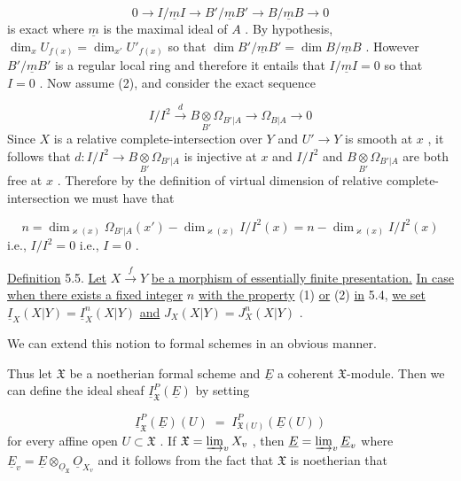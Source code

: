 \begin{equation*}
0 \to I/\underline{m}I \to B'/\underline{m}B' \to B/\underline{m}B \to 0
\end{equation*}
is exact where $\underline{m}$ is the maximal ideal of $A$ . By hypothesis, $\dim_{x}U_{f(x)} = \dim_{x'}U'_{f(x)}$ so that $\dim B'/\underline{m}B' = \dim B/\underline{m}B$ . However $B'/\underline{m}B'$ is a regular local ring and therefore it entails that $I/\underline{m}I = 0$ so that $I = 0$ . Now assume (2), and consider the exact sequence

\begin{equation*}
I/I^{2} \overset{d}{\to} B \underset{B'}{\otimes} \Omega_{B'|A} \to \Omega_{B|A} \to 0
\end{equation*}
Since $X$ is a relative complete-intersection over $Y$ and $U' \to Y$ is smooth at $x$ , it follows that $d : I/I^{2} \to B \underset{B'}{\otimes} \Omega_{B'|A}$ is injective at $x$ and $I/I^{2}$ and $B \underset{B'}{\otimes} \Omega_{B'|A}$ are both free at $x$ . Therefore by the definition of virtual dimension of relative complete-intersection we must have that

\begin{equation*}
n = \dim_{\varkappa(x)}\Omega_{B'|A}(x') - \dim_{\varkappa(x)}I/I^{2}(x) = n - \dim_{\varkappa(x)}I/I^{2}(x)
\end{equation*}
i.e., $I/I^{2} = 0$ i.e., $I = 0$ .

\underline{Definition} 5.5.   \underline{Let} $X \overset{f}{\to} Y$ \underline{be a morphism of essentially finite presentation.} \underline{In case when there exists a fixed integer} $n$ \underline{with the property} (1) \underline{or} (2) \underline{in} 5.4,
\underline{we set}  $\underline{I}_X(X|Y) = \underline{I}^n_X(X|Y)$  \underline{and}  $J_X(X|Y) = J^n_X(X|Y)$ .

We can extend this notion to formal schemes in an obvious manner.

Thus let $\mathfrak{X}$ be a noetherian formal scheme and $\underline{E}$ a coherent $\mathfrak{X}$-module. Then we can define the ideal sheaf $\underline{I}^P_{\mathfrak{X}}(\underline{E})$ by setting

\begin{equation*}
\underline{I}^P_{\mathfrak{X}}(\underline{E})(U) \;=\; I^P_{\mathfrak{X}(U)}(\underline{E}(U))
\end{equation*}
for every affine open $U \subset \mathfrak{X}$ . If $\mathfrak{X} = \varinjlim_{v} X_v$ , then $\underline{E} = \varinjlim_{v} \underline{E}_v$ where $\underline{E}_v = \underline{E} \otimes_{\underline{O}_{\mathfrak{X}}} \underline{O}_{X_v}$ and it follows from the fact that $\mathfrak{X}$ is noetherian that


